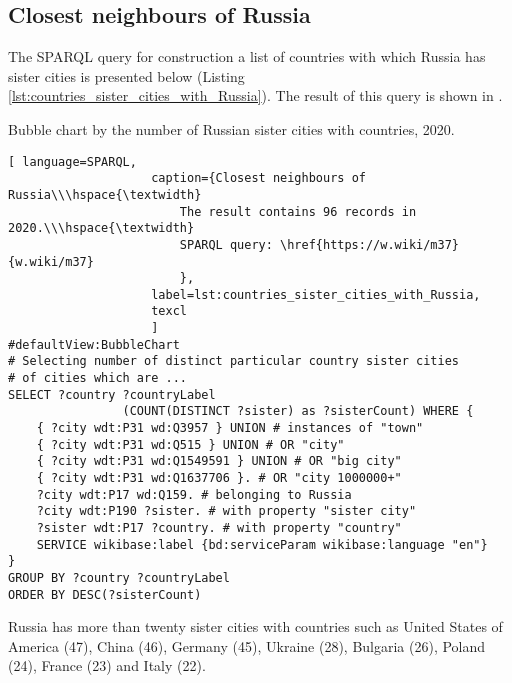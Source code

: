 \subsection{Closest neighbours of Russia}

The SPARQL query for construction a list of countries with which Russia has sister cities is presented below (Listing \ref{lst:countries_sister_cities_with_Russia}). The result of this query is shown in .

\begin{marginfigure}[2cm]
{
\setlength{\fboxsep}{0pt}%
\setlength{\fboxrule}{1pt}%
}
	\caption{Bubble chart by the number of Russian sister cities with countries, 2020.}
\end{marginfigure}

\begin{lstlisting}[ language=SPARQL, 
                    caption={Closest neighbours of Russia\\\hspace{\textwidth}
                        The result contains 96 records in 2020.\\\hspace{\textwidth}
                        SPARQL query: \href{https://w.wiki/m37}{w.wiki/m37}
                        },
                    label=lst:countries_sister_cities_with_Russia,
                    texcl 
                    ]
#defaultView:BubbleChart
# Selecting number of distinct particular country sister cities 
# of cities which are ...
SELECT ?country ?countryLabel 
				(COUNT(DISTINCT ?sister) as ?sisterCount) WHERE {                                                
	{ ?city wdt:P31 wd:Q3957 } UNION # instances of "town"
	{ ?city wdt:P31 wd:Q515 } UNION # OR "city"
	{ ?city wdt:P31 wd:Q1549591 } UNION # OR "big city"
	{ ?city wdt:P31 wd:Q1637706 }. # OR "city 1000000+"                                 
	?city wdt:P17 wd:Q159. # belonging to Russia
	?city wdt:P190 ?sister. # with property "sister city"
	?sister wdt:P17 ?country. # with property "country"
	SERVICE wikibase:label {bd:serviceParam wikibase:language "en"}
}
GROUP BY ?country ?countryLabel
ORDER BY DESC(?sisterCount)
\end{lstlisting}%

Russia has more than twenty sister cities with countries such as United States of America (47), China (46), Germany (45), Ukraine (28), Bulgaria (26), Poland (24), France (23) and Italy (22).

